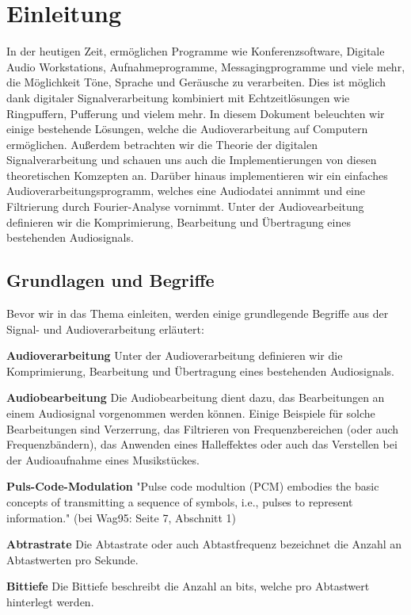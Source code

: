 \documentclass[paper=a4,fontsize=12pt,ngerman]{scrartcl}
\begin{document}
\section{Einleitung}
In der heutigen Zeit, ermöglichen Programme wie Konferenzsoftware, Digitale Audio Workstations, Aufnahmeprogramme, Messagingprogramme und viele mehr, die
Möglichkeit Töne, Sprache und Geräusche zu verarbeiten. Dies ist möglich dank
digitaler Signalverarbeitung kombiniert mit Echtzeitlösungen wie Ringpuffern, Pufferung und vielem mehr. In diesem Dokument beleuchten wir einige bestehende
Lösungen, welche die Audioverarbeitung auf Computern ermöglichen. Außerdem betrachten wir die Theorie der digitalen Signalverarbeitung und schauen uns auch die
Implementierungen von diesen theoretischen Komzepten an. Darüber hinaus implementieren wir ein einfaches Audioverarbeitungsprogramm, welches eine Audiodatei
annimmt und eine Filtrierung durch Fourier-Analyse vornimmt. Unter der Audiovearbeitung definieren wir die Komprimierung, Bearbeitung und Übertragung eines
bestehenden Audiosignals.


\subsection{Grundlagen und Begriffe}

Bevor wir in das Thema einleiten, werden einige grundlegende Begriffe aus der Signal- und Audioverarbeitung erläutert:

\textbf{Audioverarbeitung}
Unter der Audioverarbeitung definieren wir die Komprimierung, Bearbeitung und
Übertragung eines bestehenden Audiosignals.

\textbf{Audiobearbeitung}
Die Audiobearbeitung dient dazu, das Bearbeitungen an einem Audiosignal vorgenommen werden können. Einige Beispiele für solche Bearbeitungen sind Verzerrung,
das Filtrieren von Frequenzbereichen (oder auch Frequenzbändern), das Anwenden
eines Halleffektes oder auch das Verstellen bei der Audioaufnahme eines Musikstückes.

\textbf{Puls-Code-Modulation}
"Pulse code modultion (PCM) embodies the basic concepts of transmitting a sequence of symbols, i.e., pulses to represent information." \cite{waggener1995pulse, Patel2019PCM} (bei Wag95: Seite 7, Abschnitt 1)

\textbf{Abtrastrate}
Die Abtastrate oder auch Abtastfrequenz bezeichnet die Anzahl an Abtastwerten
pro Sekunde. \cite{knapp2023bituebertragung, oppenheim2013discrete}

\textbf{Bittiefe}
Die Bittiefe beschreibt die Anzahl an bits, welche pro Abtastwert hinterlegt werden. \cite{knapp2023bituebertragung, oppenheim2013discrete}
\end{document}
